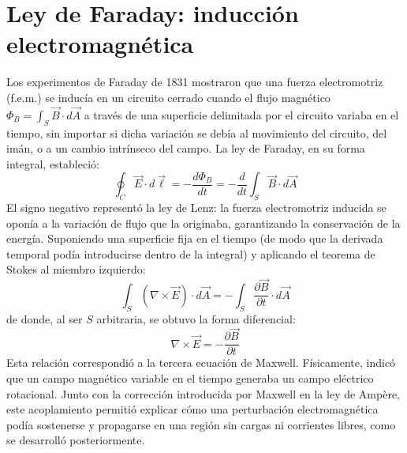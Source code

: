 \section{Ley de Faraday: inducción electromagnética}
Los experimentos de Faraday de 1831 mostraron que una fuerza electromotriz (f.e.m.) se inducía en un circuito cerrado cuando el flujo magnético $\Phi_B = \int_S \vec{B} \cdot d\vec{A}$ a través de una superficie delimitada por el circuito variaba en el tiempo, sin importar si dicha variación se debía al movimiento del circuito, del imán, o a un cambio intrínseco del campo. La ley de Faraday, en su forma integral, estableció:
\begin{equation}
    \oint_C \vec{E} \cdot d\vec{\ell} = -\frac{d\Phi_B}{dt} = -\frac{d}{dt} \int_S \vec{B} \cdot d\vec{A}
\end{equation}
El signo negativo representó la ley de Lenz: la fuerza electromotriz inducida se oponía a la variación de flujo que la originaba, garantizando la conservación de la energía. Suponiendo una superficie fija en el tiempo (de modo que la derivada temporal podía introducirse dentro de la integral) y aplicando el teorema de Stokes al miembro izquierdo:
\begin{equation}
    \int_S (\nabla \times \vec{E}) \cdot d\vec{A} = - \int_S \frac{\partial \vec{B}}{\partial t} \cdot d\vec{A}
\end{equation}
de donde, al ser $S$ arbitraria, se obtuvo la forma diferencial:
\begin{equation}
    \nabla \times \vec{E} = -\frac{\partial \vec{B}}{\partial t}
\end{equation}
Esta relación correspondió a la tercera ecuación de Maxwell. Físicamente, indicó que un campo magnético variable en el tiempo generaba un campo eléctrico rotacional. Junto con la corrección introducida por Maxwell en la ley de Ampère, este acoplamiento permitió explicar cómo una perturbación electromagnética podía sostenerse y propagarse en una región sin cargas ni corrientes libres, como se desarrolló posteriormente.

